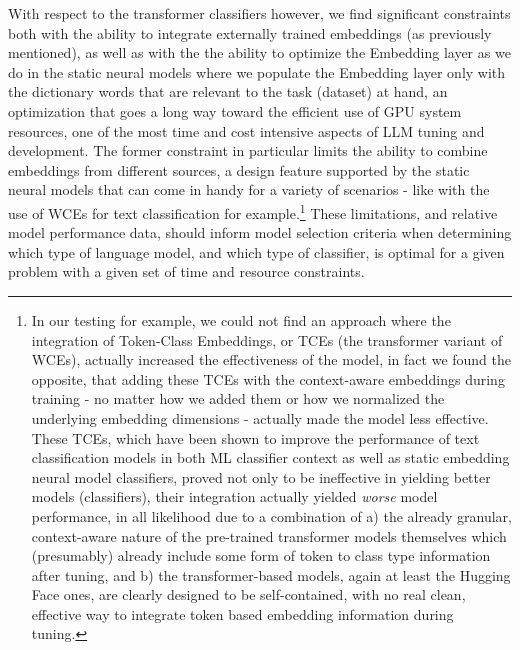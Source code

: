 \documentclass[final]{clv2025-revised}
\begin{document}
With respect to the transformer classifiers however, we find significant constraints both with the ability to integrate externally trained embeddings (as previously mentioned), as well as with the the ability to optimize the Embedding layer as we do in the static neural models where we populate the Embedding layer only with the dictionary words that are relevant to the task (dataset) at hand, an optimization that goes a long way toward the efficient use of GPU system resources, one of the most time and cost intensive aspects of LLM tuning and development. The former constraint in particular limits the ability to combine embeddings from different sources, a design feature supported by the static neural models that can come in handy for a variety of scenarios - like with the use of WCEs for text classification for example.\footnote{In our testing for example, we could not find an approach where the integration of Token-Class Embeddings, or TCEs (the transformer variant of WCEs), actually increased the effectiveness of the model, in fact we found the opposite, that adding these TCEs with the context-aware embeddings during training - no matter how we added them or how we normalized the underlying embedding dimensions - actually made the model less effective. These TCEs, which have been shown to improve the performance of text classification models in both ML classifier context as well as static embedding neural model classifiers, proved not only to be ineffective in yielding better models (classifiers), their integration actually yielded \textit{worse} model performance, in all likelihood due to a combination of a) the already granular, context-aware nature of the pre-trained transformer models themselves which (presumably) already include some form of token to class type information after tuning, and b) the transformer-based models, again at least the Hugging Face ones, are clearly designed to be self-contained, with no real clean, effective way to integrate token based embedding information during  tuning.} These limitations, and relative model performance data, should inform model selection criteria when determining which type of language model, and which type of classifier, is optimal for a given problem with a given set of time and resource constraints.
\end{document}
